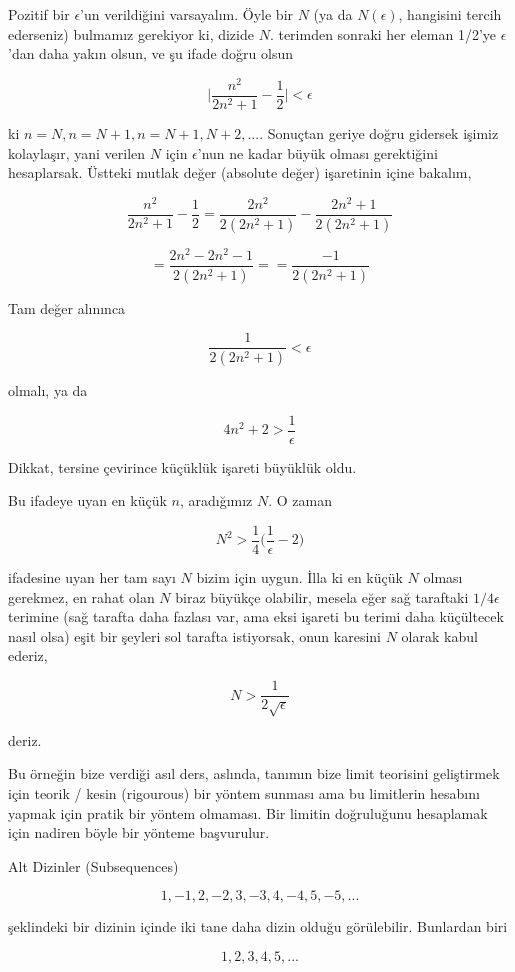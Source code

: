 \documentclass[12pt,fleqn]{article}\usepackage{../../common}
\begin{document}
Pozitif bir $\epsilon$'un verildiğini varsayalım. Öyle bir $N$ (ya da
$N(\epsilon)$, hangisini tercih ederseniz) bulmamız gerekiyor ki, dizide
$N$. terimden sonraki her eleman 1/2'ye $\epsilon$'dan daha yakın olsun, ve
şu ifade doğru olsun

$$ 
\bigg|\frac{n^2}{2n^2+1} - \frac{1}{2}\bigg| < \epsilon
 $$

ki $n=N,n=N+1,n=N+1,N+2,...$. Sonuçtan geriye doğru gidersek işimiz
kolaylaşır, yani verilen $N$ için $\epsilon$'nun ne kadar büyük olması
gerektiğini hesaplarsak. Üstteki mutlak değer (absolute değer) işaretinin 
içine bakalım, 

$$ 
\frac{n^2}{2n^2+1}  - \frac{1}{2} = 
\frac{2n^2}{2(2n^2+1)}  - \frac{2n^2+1}{2(2n^2+1)} 
 $$

$$  
= \frac{2n^2 - 2n^2 - 1}{2(2n^2+1)} = 
= \frac{- 1}{2(2n^2+1)} 
$$

Tam değer alınınca 

$$  \frac{1}{2(2n^2+1)} < \epsilon$$

olmalı, ya da

$$ 4n^2 + 2 > \frac{1}{\epsilon} $$

Dikkat, tersine çevirince küçüklük işareti büyüklük oldu. 

Bu ifadeye uyan en küçük $n$, aradığımız $N$. O zaman 

$$ N^2 > \frac{1}{4}\bigg(\frac{1}{\epsilon} - 2\bigg) $$

ifadesine uyan her tam sayı $N$ bizim için uygun. İlla ki en küçük $N$
olması gerekmez, en rahat olan $N$ biraz büyükçe olabilir, mesela eğer sağ
taraftaki $1/4\epsilon$ terimine (sağ tarafta daha fazlası var, ama eksi
işareti bu terimi daha küçültecek nasıl olsa) eşit bir şeyleri sol tarafta
istiyorsak, onun karesini $N$ olarak kabul ederiz,

$$ N > \frac{1}{2\sqrt{\epsilon}} $$

deriz. 

Bu örneğin bize verdiği asıl ders, aslında, tanımın bize limit teorisini
geliştirmek için teorik / kesin (rigourous) bir yöntem sunması ama bu
limitlerin hesabını yapmak için pratik bir yöntem olmaması. Bir limitin
doğruluğunu hesaplamak için nadiren böyle bir yönteme başvurulur. 

Alt Dizinler (Subsequences) 

$$ 1, -1, 2, -2, 3, -3, 4, -4, 5, -5, . . . $$

şeklindeki bir dizinin içinde iki tane daha dizin olduğu
görülebilir. Bunlardan biri

$$ 1, 2, 3, 4, 5, ... $$
\end{document}
